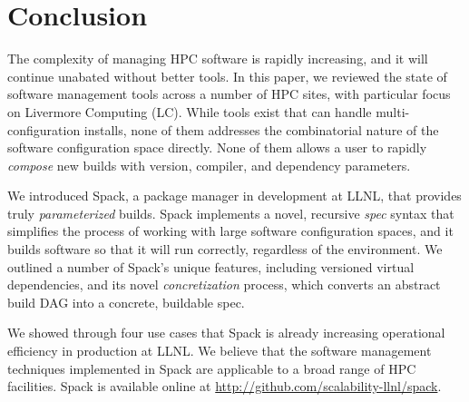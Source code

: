 
\section{Conclusion}
\label{sec:conclusion}


The complexity of managing HPC software is rapidly increasing, and it
will continue unabated without better tools.
In this paper, we reviewed the state of software management tools
across a number of HPC sites, with particular focus on Livermore
Computing (LC). While tools exist that can handle multi-configuration
installs, none of them addresses the combinatorial nature
of the software configuration space directly. None of them allows
a user to rapidly {\it compose} new builds with version, compiler,
and dependency parameters.

We introduced Spack, a package manager in development at LLNL, that
provides truly {\it parameterized} builds.  Spack implements
a novel, recursive {\it spec} syntax that simplifies the process of working
with large software configuration spaces, and it builds software
so that it will run correctly, regardless of the environment.
We outlined a number of Spack's unique features, including
versioned virtual dependencies, and its novel {\it concretization}
process, which converts an abstract build DAG into a concrete,
buildable spec.

We showed through four use cases that Spack is already increasing
operational efficiency in production at LLNL.  We believe that the
software management techniques implemented in Spack are applicable
to a broad range of HPC facilities.
Spack is available online at \url{http://github.com/scalability-llnl/spack}.
